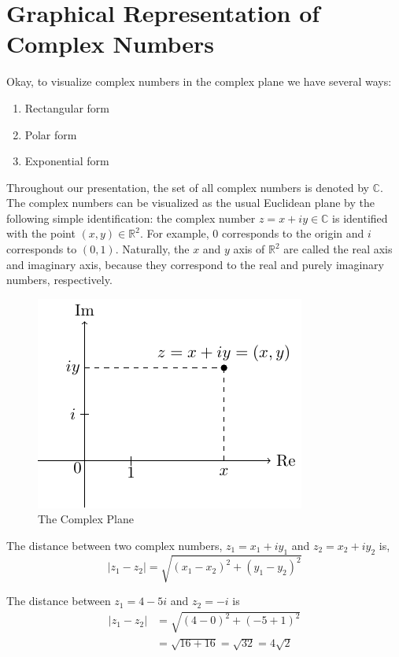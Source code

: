 \section{Graphical Representation of Complex Numbers}
Okay, to visualize complex numbers in the complex plane we have several ways: 
\begin{enumerate}
    \item Rectangular form
    \item Polar form
    \item Exponential form
\end{enumerate}
Throughout our presentation, the set of all complex numbers is denoted by $\mathbb{C}$. The complex numbers can be visualized as the usual Euclidean plane by the following simple identification: the complex number $z=x+i y \in \mathbb{C}$ is identified with the point $(x, y) \in \mathbb{R}^2$. For example, 0 corresponds to the origin and $i$ corresponds to $(0,1)$. Naturally, the $x$ and $y$ axis of $\mathbb{R}^2$ are called the real axis and imaginary axis, because they correspond to the real and purely imaginary numbers, respectively.
\begin{figure}[ht!]
    \centering
    \includegraphics{FIG_MAT215/FiG2.pdf}
    \caption{ The Complex Plane}
    \label{fig2}
\end{figure}
\FloatBarrier
\begin{defn}
    The distance between two complex numbers, $z_1=x_1+i y_1$ and $z_2=x_2+i y_2$ is,
$$
\left|z_1-z_2\right|=\sqrt{\left(x_1-x_2\right)^2+\left(y_1-y_2\right)^2}
$$
\end{defn}

\begin{ex}
     The distance between $z_1=4-5 i$ and $z_2=-i$ is
$$
\begin{aligned}
\left|z_1-z_2\right| & =\sqrt{(4-0)^2+(-5+1)^2} \\
& =\sqrt{16+16}=\sqrt{32}=4 \sqrt{2}
\end{aligned}
$$
\end{ex}
